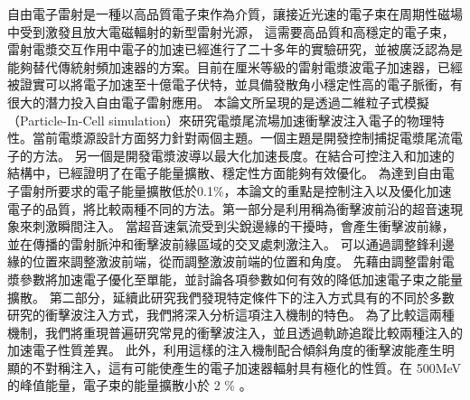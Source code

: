 
\begin{abstract*}
自由電子雷射是一種以高品質電子束作為介質，讓接近光速的電子束在周期性磁場中受到激發且放大電磁輻射的新型雷射光源，
這需要高品質和高穩定的電子束，雷射電漿交互作用中電子的加速已經進行了二十多年的實驗研究，並被廣泛認為是能夠替代傳統射頻加速器的方案。目前在厘米等級的雷射電漿波電子加速器，已經被證實可以將電子加速至十億電子伏特，並具備發散角小穩定性高的電子脈衝，有很大的潛力投入自由電子雷射應用。
本論文所呈現的是透過二維粒子式模擬（Particle-In-Cell simulation）來研究電漿尾流場加速衝擊波注入電子的物理特性。當前電漿源設計方面努力針對兩個主題。一個主題是開發控制捕捉電漿尾流電子的方法。
另一個是開發電漿波導以最大化加速長度。在結合可控注入和加速的結構中，已經證明了在電子能量擴散、穩定性方面能夠有效優化。
為達到自由電子雷射所要求的電子能量擴散低於0.1\%，本論文的重點是控制注入以及優化加速電子的品質，將比較兩種不同的方法。第一部分是利用稱為衝擊波前沿的超音速現象來刺激瞬間注入。
當超音速氣流受到尖銳邊緣的干擾時，會產生衝擊波前緣，並在傳播的雷射脈沖和衝擊波前緣區域的交叉處刺激注入。
可以通過調整鋒利邊緣的位置來調整激波前端，從而調整激波前端的位置和角度。
先藉由調整雷射電漿參數將加速電子優化至單能，並討論各項參數如何有效的降低加速電子束之能量擴散。
第二部分，延續此研究我們發現特定條件下的注入方式具有的不同於多數研究的衝擊波注入方式，我們將深入分析這項注入機制的特色。
為了比較這兩種機制，我們將重現普遍研究常見的衝擊波注入，並且透過軌跡追蹤比較兩種注入的加速電子性質差異。
此外，利用這樣的注入機制配合傾斜角度的衝擊波能產生明顯的不對稱注入，這有可能使產生的電子加速器輻射具有極化的性質。在 500MeV 的峰值能量，電子束的能量擴散小於 2 \% 。

\end{abstract*}
